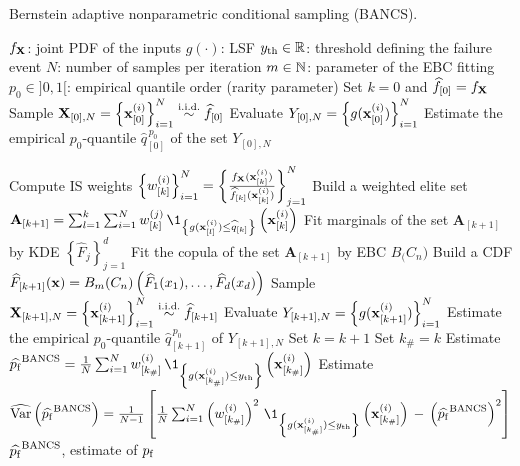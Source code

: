 \begin{algorithm}[h]
    \caption{Bernstein adaptive nonparametric conditional sampling (BANCS).}\label{alg:bancs}
    \footnotesize
    \begin{algorithmic}[1]
        \State $f_{\bf X}$: joint PDF of the inputs
        \State $g(\cdot)$: LSF
        \State $y_\mathrm{th} \in \mathbb{R}$: threshold defining the failure event 
        \State $N$: number of samples per iteration
        \State $m \in \mathbb{N}$: parameter of the EBC fitting
        \State $p_0 \in ]0, 1[$: empirical quantile order (rarity parameter)
        \State Set $k = 0$ and $\widehat{f}_{[0]} = f_{\bf X}$
        \State Sample ${\bf X}_{[0], N} = \left\{{\bf x}_{[0]}^{(i)}\right\}_{i=1}^N \overset{\text{i.i.d.}}{\sim} \widehat{f}_{[0]}$
        \State Evaluate $Y_{[0], N} = \left\{g({\bf x}_{[0]}^{(i)})\right\}_{i=1}^N$
        \State Estimate the empirical $p_0$-quantile $\widehat{q}_{[0]}^{\, p_0}$ of the set $Y_{[0], N}$
        
        \State Compute IS weights $\left\{w_{[k]}^{(i)}\right\}_{i=1}^N = \left\{\frac{f_{\bf X}({\bf x}_{[k]}^{(i)})}{\widehat{f}_{[k]}({\bf x}_{[k]}^{(i)})}\right\}_{j=1}^N$
        \State Build a weighted elite set $\mathbf{A}_{[k+1]}=\sum_{l=1}^{k} \sum_{i=1}^N w_{[k]}^{(j)} \, \1_{\left\{g(\bx_{[l]}^{(i)}) \leq \widehat{q}_{[k]} \right\}}\left(\bx_{[k]}^{(i)}\right)$
        \State Fit marginals of the set $\mathbf{A}_{[k+1]}$ by KDE $\left\{\widehat{F}_j\right\}_{j=1}^d$
        \State Fit the copula of the set $\mathbf{A}_{[k+1]}$ by EBC $B_\bm(C_n)$
        \State Build a CDF $\widehat{F}_{[k+1]}({\bf x}) = B_m(C_n)\left(\widehat{F}_1(x_1), \dots, \widehat{F}_d(x_d)\right)$
        \State Sample ${\bf X}_{[k+1], N} = \left\{{\bf x}_{[k+1]}^{(i)}\right\}_{i=1}^N \overset{\text{i.i.d.}}{\sim} \widehat{f}_{[k+1]}$
        \State Evaluate $Y_{[k+1], N} = \left\{g({\bf x}_{[k+1]}^{(i)})\right\}_{i=1}^N$
        \State Estimate the empirical $p_0$-quantile $\widehat{q}_{[k+1]}^{\, p_0}$ of $Y_{[k+1], N}$
\State Set $k = k+1$
\EndWhile
\State Set $k_\# = k$
\State Estimate $\widehat{\pf}^{\mathrm{BANCS}} = \frac1N \sum_{i=1}^N w_{[k_\#]}^{(i)} \, \1_{\left\{g(\bx_{[k_\#]}^{(i)}) \leq \yth \right\}}\left(\bx_{[k_\#]}^{(i)}\right)$
\State Estimate $\what{\var}\left(\widehat{\pf}^{\mathrm{BANCS}}\right) = \frac{1}{N-1} \left[\frac1N \sum_{i=1}^N \left(w_{[k_\#]}^{(i)}\right)^2 \, \1_{\left\{g(\bx_{[k_\#]}^{(i)}) \leq \yth \right\}}\left(\bx_{[k_\#]}^{(i)}\right) \, - \, \left(\widehat{\pf}^{\mathrm{BANCS}}\right)^2\right]$
\State $\widehat{p_\mathrm{f}}^{\mathrm{BANCS}}$, estimate of $p_\mathrm{f}$
\end{algorithmic}
\end{algorithm}
